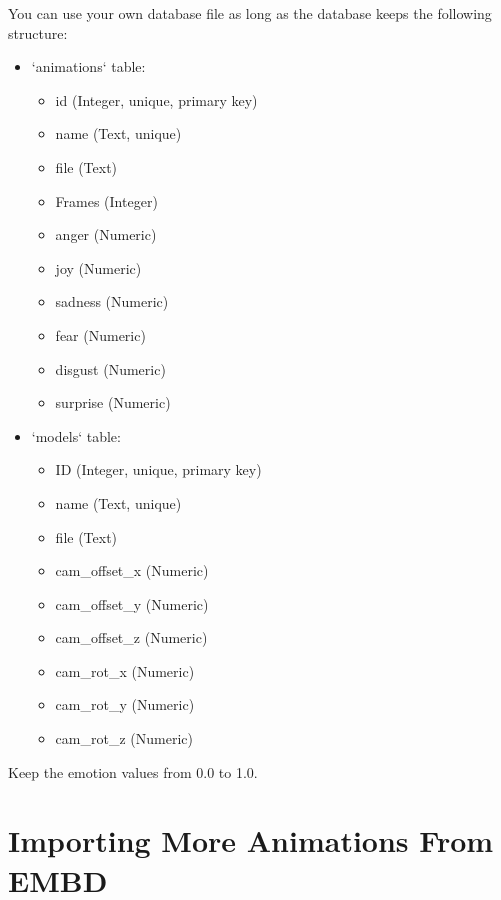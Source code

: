 \noindent You can use your own database file as long as the database keeps the following structure:
\begin{itemize}
	\item `animations` table:
	
	\begin{itemize}
		\item id (Integer, unique, primary key)
		\item name (Text, unique)
		\item file (Text)
		\item Frames (Integer)
		\item anger (Numeric)
		\item joy (Numeric)
		\item sadness (Numeric)
		\item fear (Numeric)
		\item disgust (Numeric)
		\item surprise (Numeric)
	\end{itemize}

	\item `models` table:
	
	\begin{itemize}
		\item ID (Integer, unique, primary key)
		\item name (Text, unique)
		\item file (Text)
		\item cam\_offset\_x (Numeric)
		\item cam\_offset\_y (Numeric)
		\item cam\_offset\_z (Numeric)
		\item cam\_rot\_x (Numeric)
		\item cam\_rot\_y (Numeric)
		\item cam\_rot\_z (Numeric)
	\end{itemize}
\end{itemize}

\noindent Keep the emotion values from 0.0 to 1.0.

\section{Importing More Animations From EMBD}



